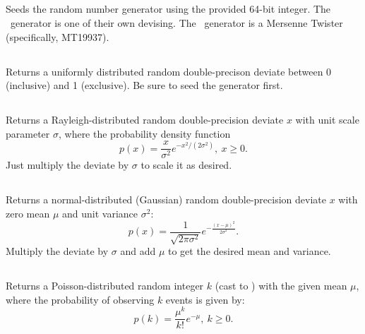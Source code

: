 \subsection{}

Seeds the random number generator using the provided 64-bit integer.
The \nr\ generator is one of their own devising.  The \gsl\ generator
is a Mersenne Twister (specifically, MT19937).

\subsection{}

Returns a uniformly distributed random double-precison deviate between
0 (inclusive) and 1 (exclusive).  Be sure to seed the generator first.

\subsection{}

Returns a Rayleigh-distributed random double-precision deviate $x$
with unit scale parameter $\sigma$, where the probability density
function
\begin{displaymath}
  p(x) = \frac{x}{\sigma^2} e^{-x^2/(2\sigma^2)},\ x \ge 0.
\end{displaymath}
Just multiply the deviate by $\sigma$ to scale it as desired.

\subsection{}

Returns a normal-distributed (Gaussian) random double-precision
deviate $x$ with zero mean $\mu$ and unit variance $\sigma^2$:
\begin{displaymath}
  p(x) = \frac{1}{\sqrt{2 \pi \sigma^2}} e^{-\frac{(x - \mu)^2}{2
      \sigma^2}} .
\end{displaymath}
Multiply the deviate by $\sigma$ and add $\mu$ to get the desired mean
and variance.

\subsection{}

Returns a Poisson-distributed random integer $k$ (cast to
) with the given mean $\mu$, where the probability of
observing $k$ events is given by:
\begin{displaymath}
  p(k) = \frac{\mu^k}{k!} e^{-\mu},\ k \ge 0.
\end{displaymath}


